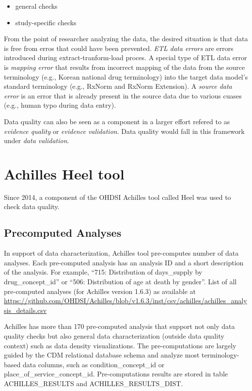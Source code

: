 \documentclass[11pt]{book}
\providecommand{\tightlist}{%
  \setlength{\itemsep}{0pt}\setlength{\parskip}{0pt}}
\theoremstyle{definition}
\theoremstyle{definition}
\theoremstyle{definition}
\theoremstyle{remark}
\begin{document}
\begin{itemize}
\tightlist
\item
  general checks
\item
  study-specific checks
\end{itemize}

From the point of researcher analyzing the data, the desired situation is that data is free from erros that could have been prevented. \emph{ETL data errors} are errors introduced during extract-tranform-load proces. A special type of ETL data error is \emph{mapping error} that results from incorrect mapping of the data from the source terminology (e.g., Korean national drug terminology) into the target data model's standard terminology (e.g., RxNorm and RxNorm Extension). A \emph{source data error} is an error that is already present in the source data due to various cuases (e.g., human typo during data entry).\citep{huser_multisite_2016}

Data quality can also be seen as a component in a larger effort refered to as \emph{evidence quality} or \emph{evidence validation}. Data quality would fall in this framework under \emph{data validation}.

\hypertarget{achilles-heel-tool}{%
\section{Achilles Heel tool}\label{achilles-heel-tool}}

Since 2014, a component of the OHDSI Achilles tool called Heel was used to check data quality.\citep{huser_methods_2018}

\hypertarget{precomputed-analyses}{%
\subsection{Precomputed Analyses}\label{precomputed-analyses}}

In support of data characterization, Achilles tool pre-computes number of data analyses. Each pre-computed analysis has an analysis ID and a short description of the analysis. For example, ``715: Distribution of days\_supply by drug\_concept\_id'' or ``506: Distribution of age at death by gender''. List of all pre-computed analyses (for Achilles version 1.6.3) as available at \url{https://github.com/OHDSI/Achilles/blob/v1.6.3/inst/csv/achilles/achilles_analysis_details.csv}

Achilles has more than 170 pre-computed analysis that support not only data quality checks but also general data characterization (outside data quality context) such as data density visualizations. The pre-computations are largely guided by the CDM relational database schema and analyze most terminology-based data columns, such as condition\_concept\_id or place\_of\_service\_concept\_id. Pre-computations results are stored in table ACHILLES\_RESULTS and ACHILLES\_RESULTS\_DIST.
\end{document}
